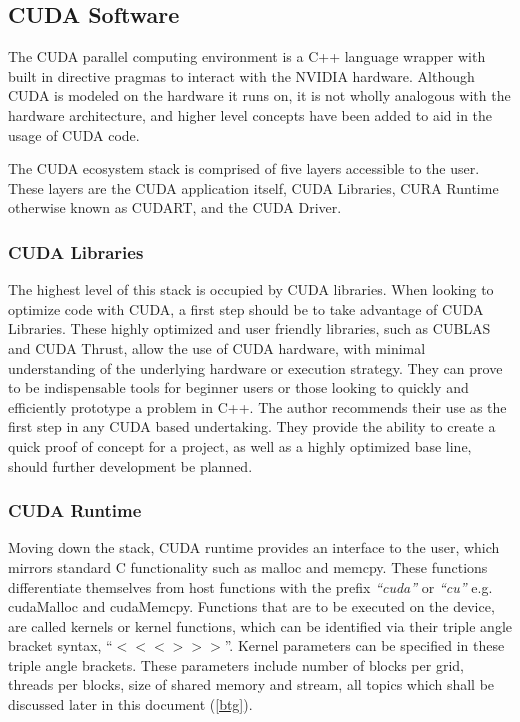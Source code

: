\subsection{CUDA Software}

The CUDA parallel computing environment is a C++ language wrapper with built in
\gls{directive pragmas} to interact with the NVIDIA hardware.  Although CUDA is modeled on the
hardware it runs on, it is not wholly analogous with the hardware architecture,
and higher level concepts have been added to aid in the usage of CUDA code.
\par
The CUDA ecosystem stack is comprised of five layers accessible to the user.
These layers are the CUDA application itself, CUDA Libraries, CURA Runtime otherwise
known as CUDART, and the CUDA Driver.


\subsubsection{CUDA Libraries}

The highest level of this stack is occupied
by CUDA libraries. When looking to optimize code with CUDA, a
first step should be to take advantage of CUDA Libraries.  These highly optimized
and user friendly libraries, such as CUBLAS and CUDA Thrust, allow the use of
CUDA hardware, with minimal understanding of the underlying hardware or execution strategy.
They can prove to be indispensable tools for beginner users or those looking to quickly and
efficiently prototype a problem in C++. The author recommends their use as the first step
in any CUDA based undertaking. They provide the ability to create a quick proof
of concept for a project, as well as a highly optimized base line, should further
development be planned.
\subsubsection{CUDA Runtime}

Moving down the stack, CUDA runtime provides an interface to the user, which mirrors
standard C functionality such as malloc and memcpy.  These functions differentiate
themselves from host functions with the prefix \textit{``cuda''} or \textit{``cu''}
e.g. cudaMalloc and cudaMemcpy.  Functions that are to be executed on the
device, are called kernels or kernel functions, which can be identified
 via their triple angle bracket syntax, ``$<<< >>>$''.
Kernel parameters can be specified in these triple angle brackets.  These parameters
include number of blocks per grid, threads per blocks, size of shared memory and
stream, all topics which shall be discussed later in this document (\ref{btg}).

